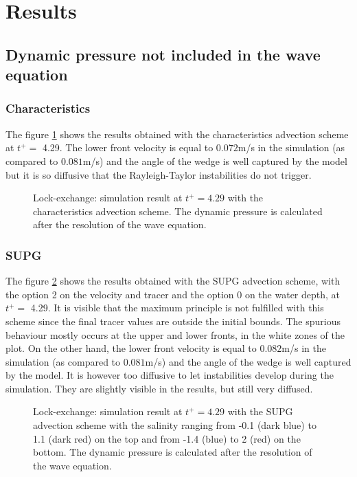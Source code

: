 \section{Results}
%
\subsection{Dynamic pressure not included in the wave equation}

\subsubsection{Characteristics}

The figure \ref{fig:lock-exchange_dp_no_carac} shows the results obtained with the characteristics advection scheme at $t^+=$ 4.29.
The lower front velocity is equal to $0.072$m/s in the simulation (as compared to $0.081$m/s) and the angle of the wedge is well captured
by the model but it is so diffusive that the Rayleigh-Taylor instabilities do not trigger.
\begin{figure}[ht]
  \begin{center}
    \caption{Lock-exchange: simulation result at $t^+=4.29$ with the characteristics advection scheme.
      The dynamic pressure is calculated after the resolution of the wave equation.}
    \label{fig:lock-exchange_dp_no_carac}
  \end{center}
\end{figure}

\subsubsection{SUPG}
The figure \ref{fig:lock-exchange_dp_no_SUPG} shows the results obtained with the SUPG advection scheme, with the option 2 on the velocity and tracer and the option 0 on the water depth, at $t^+=$ 4.29.
It is visible that the maximum principle is not fulfilled with this scheme since the final tracer values are outside the initial bounds.
The spurious behaviour mostly occurs at the upper and lower fronts, in the white zones of the plot.
On the other hand, the lower front velocity is equal to $0.082$m/s in the simulation (as compared to $0.081$m/s) and the angle of the wedge
is well captured by the model. It is however too diffusive to let instabilities develop during the simulation.
They are slightly visible in the results, but still very diffused.
\begin{figure}[ht]
  \begin{center}
    \caption{Lock-exchange: simulation result at $t^+=4.29$ with the SUPG advection scheme with the salinity ranging from -0.1 (dark blue)
      to 1.1 (dark red) on the top and from -1.4 (blue) to 2 (red) on the bottom.
      The dynamic pressure is calculated after the resolution of the wave equation.}
    \label{fig:lock-exchange_dp_no_SUPG}
  \end{center}
\end{figure}

